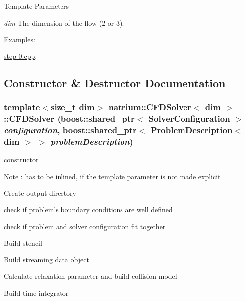 \begin{DoxyTemplParams}{Template Parameters}
\item[{\em dim}]The dimension of the flow (2 or 3). \end{DoxyTemplParams}
\begin{Desc}
\item[Examples: ]\par


\hyperlink{step-0_8cpp-example}{step-\/0.cpp}.\end{Desc}


\subsection{Constructor \& Destructor Documentation}
\hypertarget{classnatrium_1_1CFDSolver_a47ca594a73dc5ab04e319ba588cda3dd}{
\subsubsection[{CFDSolver}]{\setlength{\rightskip}{0pt plus 5cm}template$<$size\_\-t dim$>$ {\bf natrium::CFDSolver}$<$ dim $>$::{\bf CFDSolver} (boost::shared\_\-ptr$<$ {\bf SolverConfiguration} $>$ {\em configuration}, \/  boost::shared\_\-ptr$<$ {\bf ProblemDescription}$<$ dim $>$ $>$ {\em problemDescription})}}
\label{classnatrium_1_1CFDSolver_a47ca594a73dc5ab04e319ba588cda3dd}
constructor \begin{DoxyNote}{Note}
: has to be inlined, if the template parameter is not made explicit 
\end{DoxyNote}


Create output directory

check if problem's boundary conditions are well defined

check if problem and solver configuration fit together

Build stencil

Build streaming data object

Calculate relaxation parameter and build collision model

Build time integrator 

